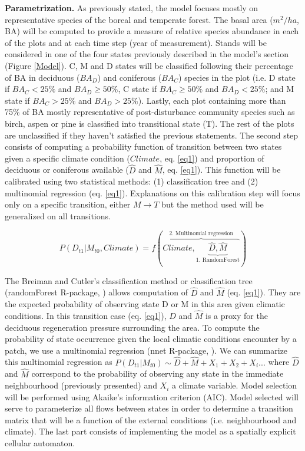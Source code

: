 \textbf{Parametrization.} As previously stated, the model focuses mostly on
representative species of the boreal and temperate forest. The basal area
($m^2/ha$, BA) will be computed to provide a measure of relative species
abundance in each of the plots and at each time step (year of measurement).
Stands will be considered in one of the four states previously described in
the model's section (Figure \ref{Model}). C, M and D states will be classified
following their percentage of BA in deciduous ($BA_D$) and coniferous ($BA_C$)
species in the plot (i.e. D state if $BA_C < 25\%$ and $BA_D \geq 50\%$, C
state if ${BA}_C \geq 50\%$ and $BA_D < 25\%$; and M state if $BA_C > 25\%$
and $BA_D > 25\%$). Lastly, each plot containing more than 75\% of BA mostly
representative of post-disturbance community species such as birch, aspen or
pine is classified into transitional state (T). The rest of the plots are
unclassified if they haven't satisfied the previous statements. The second
step consists of computing a probability function of transition between two
states given a specific climate condition ($Climate$, eq. \ref{eq1}) and
proportion of deciduous or coniferous available ($\hat{D}$ and $\hat{M}$, eq.
\ref{eq1}). This function will be calibrated using two statistical methods:
(1) classification tree and (2) multinomial regression (eq. \ref{eq1}).
Explanations on this calibration step will focus only on a specific
transition, either $M \rightarrow T$ but the method used will be generalized
on all transitions.

\begin{equation}
	P(D_{t1}|M_{t0}, Climate) = f(\overbrace{Climate, \underbrace{\hat{D}, \hat{M}}_\text{1. RandomForest}}^\text{2. Multinomial regression})
\label{eq1}
\end{equation}


The Breiman and Cutler's classification method or classification tree
(randomForest R-package, \cite{Liaw2002a}) allows computation of $\hat{D}$ and
$\hat{M}$ (eq. \ref{eq1}). They are the expected probability of observing
state D or M in this area given climatic conditions. In this transition case
(eq. \ref{eq1}), $\hat{D}$ and $\hat{M}$ is a proxy for the deciduous
regeneration pressure surrounding the area. To compute the probability of
state occurrence given the local climatic conditions encounter by a patch, we
use a multinomial regression (nnet R-package, \cite{Venables2002}). We can
summarize this multinomial regression as $P(D_{t1}|M_{t0}) \sim \hat{D} +
\hat{M} + X_1+X_2+X_i... $ where $\hat{D}$ and $\hat{M}$ correspond to the
probability of observing any state in the immediate neighbourhood (previously
presented) and $X_i$ a climate variable. Model selection will be performed using
Akaike's information criterion (AIC). Model selected will serve to parameterize
all flows between states in order to determine a transition matrix that will
be a function of the external conditions (i.e. neighbourhood and climate). 
The last part consists of implementing the model as a spatially explicit cellular
automaton. \\

